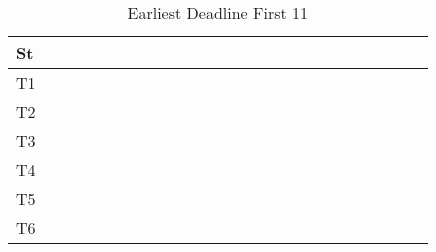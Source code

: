 \documentclass[xcolor=table]{beamer}
\begin{document}
\begin{frame}
\begin{table}
{\begin{tabular}{|l|l|l|l|l|l|l|l|l|l|l|l|l|l|l|l|l|l|l|l|l|l|l|l|l|}
\hline 
St &  \cellcolor{green} &  \cellcolor{green} &  \cellcolor{green} &  \cellcolor{green} &  \cellcolor{green} &  \cellcolor{green} &  \cellcolor{green} &  \cellcolor{green} &  \cellcolor{green} &  \cellcolor{green} &  \cellcolor{green} &  \cellcolor{green} &  \cellcolor{green} &  \cellcolor{green} &  \cellcolor{green} &  \cellcolor{green} &  \cellcolor{green} &  \cellcolor{green} &  \cellcolor{green} &  \cellcolor{green} &  \cellcolor{green} &  \cellcolor{green} &  \cellcolor{green} &  \cellcolor{green} \\ \hline 
T1 & & & & & & & & & & & & & & & & & & & & & & & & \\ \hline 
T2 & \cellcolor{purple} & \cellcolor{purple} & \cellcolor{purple} & \cellcolor{purple} & \cellcolor{purple} & \cellcolor{purple} & \cellcolor{purple} & \cellcolor{purple} & \cellcolor{purple} & \cellcolor{purple} & \cellcolor{purple} & \cellcolor{purple} & \cellcolor{purple} & \cellcolor{purple} & \cellcolor{purple} & \cellcolor{purple} & \cellcolor{purple} & \cellcolor{purple} & \cellcolor{purple} & \cellcolor{purple} & \cellcolor{purple} & \cellcolor{purple} & \cellcolor{purple} & \cellcolor{purple} \\ \hline 
T3 & & & & & & & & & & & & & & & & & & & & & & & & \\ \hline 
T4 & & & & & & & & & & & & & & & & & & & & & & & & \\ \hline 
T5 & & & & & & & & & & & & & & & & & & & & & & & & \\ \hline 
T6 & & & & & & & & & & & & & & & & & & & & & & & & \\ \hline 
\end{tabular} 
} 
\caption{ Earliest Deadline First 11 } 
\end{table} 
\begin{table} 
\centering 
{}
\end{table}
\end{frame}
\end{document}

